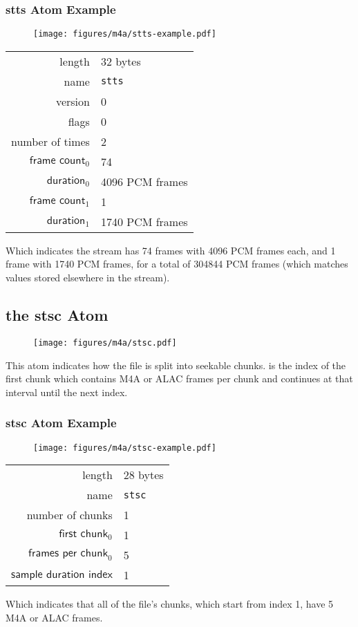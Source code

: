 \subsubsection{stts Atom Example}
\begin{figure}[h]
  \texttt{[image: figures/m4a/stts-example.pdf]}
\end{figure}
\par
\noindent
\begin{tabular}{rl}
  \textsf{length} & 32 bytes \\
  \textsf{name} & \texttt{stts} \\
  \textsf{version} & 0 \\
  \textsf{flags} & 0 \\
  \textsf{number of times} & 2 \\
  $\textsf{frame count}_0$ & 74 \\
  $\textsf{duration}_0$ & 4096 PCM frames \\
  $\textsf{frame count}_1$ & 1 \\
  $\textsf{duration}_1$ & 1740 PCM frames \\
\end{tabular}
\par
\noindent
Which indicates the stream has 74 frames with 4096 PCM frames each,
and 1 frame with 1740 PCM frames, for a total of 304844 PCM frames
(which matches values stored elsewhere in the stream).

\clearpage

\subsection{the stsc Atom}
\label{atom:stsc}
\begin{figure}[h]
  \texttt{[image: figures/m4a/stsc.pdf]}
\end{figure}
\par
\noindent
This atom indicates how the file is split into seekable chunks.
 is the index of the first chunk
which contains  M4A or ALAC frames per
chunk and continues at that interval until the next index.

\subsubsection{stsc Atom Example}
\begin{figure}[h]
  \texttt{[image: figures/m4a/stsc-example.pdf]}
\end{figure}
\par
\noindent
\begin{tabular}{rl}
  \textsf{length} & 28 bytes \\
  \textsf{name} & \texttt{stsc} \\
  \textsf{number of chunks} & 1 \\
  $\textsf{first chunk}_0$ & 1 \\
  $\textsf{frames per chunk}_0$ & 5 \\
  $\textsf{sample duration index}$ & 1 \\
\end{tabular}
\par
\noindent
Which indicates that all of the file's chunks, which start from index 1,
have 5 M4A or ALAC frames.

